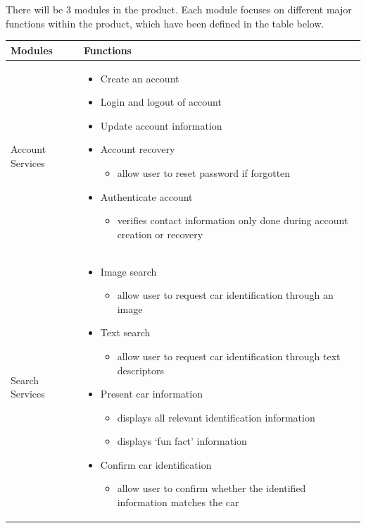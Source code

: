 \documentclass[]{article}
\begin{document}
There will be 3 modules in the product. Each module focuses on different major functions within the product, which have been defined in the table below.

\begin{tabular}{|p{3cm}|p{13cm}|}
	\hline
	Modules & Functions \\
	\hline
	Account Services &
	\begin{itemize} [left=2pt]
		\item Create an account
		\item Login and logout of account
		\item Update account information
		\item Account recovery
		\begin{itemize}
			\item allow user to reset password if forgotten
		\end{itemize}
		\item Authenticate account
		\begin{itemize}
			\item verifies contact information only done during account creation or recovery
		\end{itemize}
	\end{itemize} \\
	\hline
	Search Services &
	\begin{itemize} [left=2pt]
		\item Image search
		\begin{itemize}
			\item allow user to request car identification through an image
		\end{itemize}
		\item Text search
		\begin{itemize}
			\item allow user to request car identification through  text descriptors
		\end{itemize}
		\item Present car information
		\begin{itemize}
			\item displays all relevant identification information
			\item displays ‘fun fact’ information
		\end{itemize}
		\item Confirm car identification
		\begin{itemize}
			\item allow user to confirm whether the identified information matches the car

\end{itemize}
\end{itemize}
\end{tabular}
\end{document}

